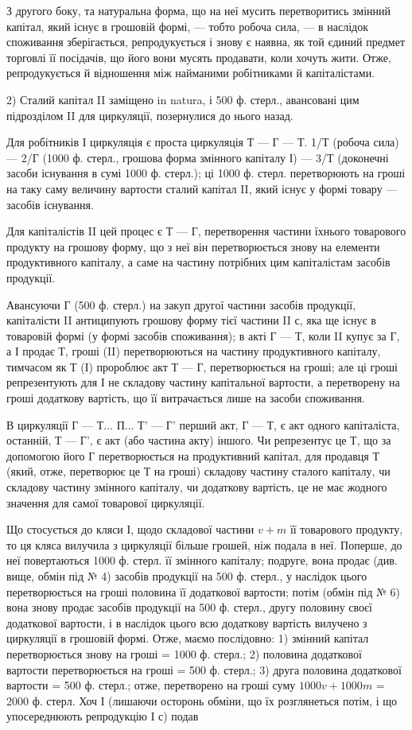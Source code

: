 З другого боку, та натуральна форма, що на неї мусить перетворитись
змінний капітал, який існує в грошовій формі, — тобто робоча сила, —
в наслідок споживання зберігається, репродукується і знову є наявна,
як той єдиний предмет торговлі її посідачів, що його вони мусять продавати,
коли хочуть жити. Отже, репродукується й відношення між найманими
робітниками й капіталістами.

2) Сталий капітал II заміщено in natura, і 500 ф. стерл., авансовані
цим підрозділом II для циркуляції, позернулися до нього назад.

Для робітників І циркуляція є проста циркуляція Т — Г — Т. 1/Т (робоча
сила) — 2/Г (1000 ф. стерл., грошова форма змінного капіталу І) — 3/Т
(доконечні засоби існування в сумі 1000 ф. стерл.); ці 1000 ф. стерл.
перетворюють на гроші на таку саму величину вартости сталий капітал II,
який існує у формі товару — засобів існування.

Для капіталістів II цей процес є Т — Г, перетворення частини їхнього
товарового продукту на грошову форму, що з неї він перетворюється
знову на елементи продуктивного капіталу, а саме на частину потрібних
цим капіталістам засобів продукції.

Авансуючи Г (500 ф. стерл.) на закуп другої частини засобів продукції,
капіталісти II антиципують грошову форму тієї частини II с, яка
ще існує в товаровій формі (у формі засобів споживання); в акті Г — Т,
коли II купує за Г, а І продає Т, гроші (II) перетворюються на частину
продуктивного капіталу, тимчасом як Т (І) пророблює акт Т — Г, перетворюється
на гроші; але ці гроші репрезентують для І не складову частину
капітальної вартости, а перетворену на гроші додаткову вартість, що її
витрачається лише на засоби споживання.

В циркуляції Г — Т... П... Т' — Г' перший акт, Г — Т, є акт одного капіталіста,
останній, Т — Г', є акт (або частина акту) іншого. Чи репрезентує
це Т, що за допомогою його Г перетворюється на продуктивний капітал,
для продавця Т (який, отже, перетворює це Т на гроші) складову частину
сталого капіталу, чи складову частину змінного капіталу, чи додаткову
вартість, це не має жодного значення для самої товарової циркуляції.

Що стосується до кляси І, щодо складової частини $v + m$ її товарового
продукту, то ця кляса вилучила з циркуляції більше грошей, ніж подала
в неї. Поперше, до неї повертаються 1000 ф. стерл. її змінного капіталу;
подруге, вона продає (див. вище, обмін під № 4) засобів продукції
на 500 ф. стерл., у наслідок цього перетворюється на гроші половина
її додаткової вартости; потім (обмін під № 6) вона знову продає засобів
продукції на 500 ф. стерл., другу половину своєї додаткової вартости,
і в наслідок цього всю додаткову вартість вилучено з циркуляції в грошовій
формі. Отже, маємо послідовно: 1) змінний капітал перетворюється
знову на гроші = 1000 ф. стерл.; 2) половина додаткової вартости перетворюється
на гроші = 500 ф. стерл.; 3) друга половина додаткової
вартости = 500 ф. стерл.; отже, перетворено на гроші суму
$1000 v + 1000 m$ = 2000 ф. стерл. Хоч І (лишаючи осторонь обміни,
що їх розглянеться потім, і що упосереднюють репродукцію І с) подав
\parbreak{}  %
